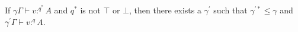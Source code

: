 \documentclass[acmsmall,screen,nonacm]{acmart}
\newcommand{\tee}{\vdash}
\DeclareMathOperator{\scale}{\mathbin{\triangleleft}}
\DeclareMathOperator{\boxop}{\mathbin{\triangleright}}
\begin{document}




\begin{lemma}
\label{lem:new-modal-star-invariant}
  If $\gamma\Gamma \tee v :^{q^*} A$ and $q^*$ is not $\top$ or $\bot$, then there exists a $\gamma^\prime$ such that $\gamma^{\prime*} \le \gamma$ and $\gamma^{\prime}\Gamma \tee v :^q A$.
\end{lemma}
\end{document}
